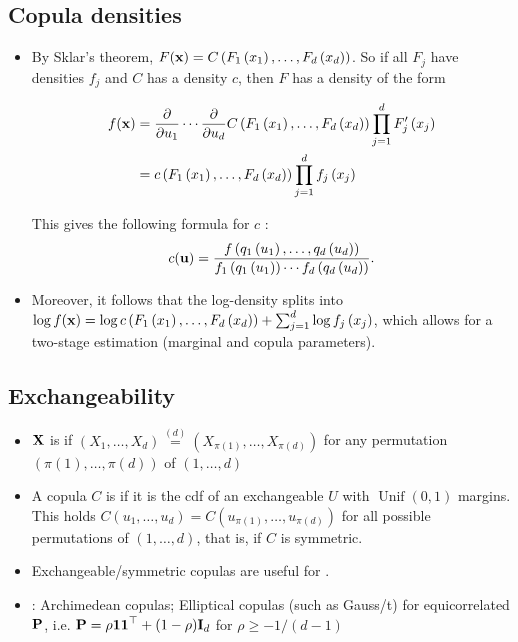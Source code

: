 \subsection*{Copula densities}
\begin{itemize}[leftmargin=*]
    \item By Sklar's theorem, $F(\operatorname{\boldsymbol{\mathbf{x}}})=C\left(F_{1}\left(x_{1}\right), \ldots, F_{d}\left(x_{d}\right)\right)$. So if all $F_{j}$ have densities $f_{j}$ and $C$ has a density $c$, then $F$ has a density of the form
    
$$
\begin{aligned}
f(\operatorname{\boldsymbol{\mathbf{x}}})&=\frac{\partial}{\partial u_{1}} \cdots \frac{\partial}{\partial u_{d}} C\left(F_{1}\left(x_{1}\right), \ldots, F_{d}\left(x_{d}\right)\right) \prod_{j=1}^{d} F_{j}^{\prime}\left(x_{j}\right)\\
&=c\left(F_{1}\left(x_{1}\right), \ldots, F_{d}\left(x_{d}\right)\right) \prod_{j=1}^{d} f_{j}\left(x_{j}\right) 
\end{aligned}
$$

This gives the following formula for $c$ :
$$
c(\operatorname{\boldsymbol{\mathbf{u}}})=\frac{f\left(q_{1}\left(u_{1}\right), \ldots, q_{d}\left(u_{d}\right)\right)}{f_{1}\left(q_{1}\left(u_{1}\right)\right) \cdots f_{d}\left(q_{d}\left(u_{d}\right)\right)} .
$$
    \item Moreover, it follows that the log-density splits into
$
\log f(\operatorname{\boldsymbol{\mathbf{x}}})=\log c\left(F_{1}\left(x_{1}\right), \ldots, F_{d}\left(x_{d}\right)\right)+\sum_{j=1}^{d} \log f_{j}\left(x_{j}\right)$, which allows for a two-stage estimation (marginal and copula parameters).
\end{itemize}









\subsection*{Exchangeability}
\begin{itemize}[leftmargin=*]
    \item $\operatorname{\boldsymbol{\mathbf{X}}}$ is  if $\left(X_{1}, \ldots, X_{d}\right) \stackrel{(d)}{=}\left(X_{\pi(1)}, \ldots, X_{\pi(d)}\right)$ for any permutation $(\pi(1), \ldots, \pi(d))$ of $(1, \ldots, d)$
    \item A copula $C$ is  if it is the cdf of an exchangeable $U$ with $\operatorname{Unif}(0,1)$ margins. This holds  $C\left(u_{1}, \ldots, u_{d}\right)=C\left(u_{\pi(1)}, \ldots, u_{\pi(d)}\right)$ for all possible permutations of $(1, \ldots, d)$, that is, if $C$ is symmetric.
    \item Exchangeable/symmetric copulas are useful for .
    \item {}: Archimedean copulas; Elliptical copulas (such as Gauss/t) for equicorrelated $\boldsymbol{\mathbf{P}}$, i.e. $\boldsymbol{\mathbf{P}}=\rho \boldsymbol{\mathbf{11}}^{\operatorname{\top}}+(1-\rho) \boldsymbol{\mathbf{I}}_{d}$ for $\rho \geq-1 /(d-1)$
\end{itemize}






